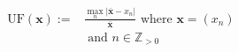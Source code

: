 \begin{equation}
\begin{split}	
	\text{UF}(\textbf{x}) :=& \frac{\max_n |\overline{\textbf{x}} - x_n|}{\overline{\textbf{x}}} \text{ where } \textbf{x} = (x_n) \\
	&\text{ and } n \in \mathbb{Z}_{>0}
\end{split}
\label{ch1:equ:unbalance-equation}
\end{equation}